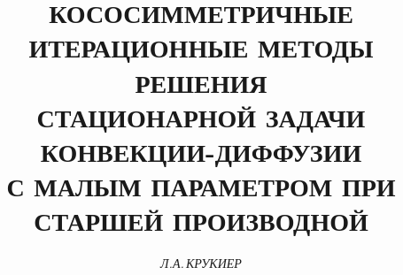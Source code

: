 

 




 


\newcommand{\A}{{\cal A}} 




\newcommand{\diag}{\operatorname{diag}} 

















 


\setcounter{page}{77} 








\author{\it Л.А.\,КРУКИЕР} 


\title{КОСОСИММЕТРИЧНЫЕ ИТЕРАЦИОННЫЕ МЕТОДЫ РЕШЕНИЯ\\ 


СТАЦИОНАРНОЙ ЗАДАЧИ КОНВЕКЦИИ-ДИФФУЗИИ\\ 


С МАЛЫМ ПАРАМЕТРОМ ПРИ СТАРШЕЙ ПРОИЗВОДНОЙ} 


 




\date{} 


\pagestyle{plain} 


 


 


\maketitle 


